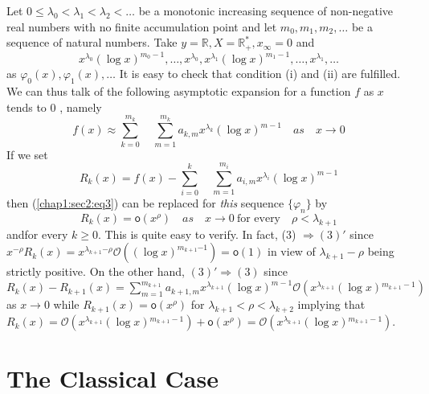 \begin{example}\label{chap1:sec2:exp2} %
  Let $0\le \lambda_{0} < \lambda_{1} < \lambda_{2} <
  \ldots$ be a monotonic increasing sequence of non-negative real
  numbers with no finite accumulation point and let
  $m_{0},m_{1},m_{2},\ldots$ be a sequence of natural numbers. Take
  $y=\mathbb{R}, X=\mathbb{R}_{+}^{*}, x_{\infty}=0$ and
  \begin{equation*}
    x^{\lambda_{0}}(\log
    x)^{m_0-1},\ldots,x^{\lambda_{0}},x^{\lambda_{1}} (\log
    x)^{m_1-1},\ldots,{x^{\lambda_{1}}},\ldots
  \end{equation*}
  as $\varphi_0(x),\varphi_1(x),\ldots$ It is easy to check that
  condition (i) and (ii) are fulfilled. We can thus talk of the
  following asymptotic expansion for a function $f$ as $x$ tends to $0$
  , namely
  \begin{equation*}
    f(x)\approx\sum_{k=0}^{m_k}\quad\sum_{m=1}^{m_k}a_{k,m}x{}^
    {\lambda_{k}}(\log
    x)^{m-1}\quad as \quad x\rightarrow 0
  \end{equation*}
  If we set
  \begin{equation*}
    R_{k}(x)=f(x)-\sum_{i=0}^{k}\quad\sum_{m=1}^{m_i}a_{i,m}x{}^{\lambda_{i}}(\log
    x)^{m-1}
  \end{equation*}
  then (\ref{chap1:sec2:eq3}) can be replaced for {\em this} sequence $\{\varphi_{n}\}$
  by
  \begin{equation*}
    R_{k}(x)=\mathsf{o}(x^{\rho})\quad as \quad x\rightarrow 0
    ~\text{for every} \quad
    \rho<\lambda_{k+1}\tag*{$(3')$}\label{chap1:sec2:eq3'} 
  \end{equation*}
  and\pageoriginale for every $k\ge0$. This is quite easy to verify. In fact,
  (3) $\Rightarrow(3)'$ since
  $x^{-\rho}R_{k}(x) = x{}^{\lambda_{k+1}{-\rho}}\mathcal{O}((\log
  x)^{m_{k+1}{-1}})=\mathsf{o}(1)$ in view of $\lambda_{k+1}-\rho$ being
  strictly positive. On the other hand, $(3)'\Rightarrow (3)$ since
  $R_{k}(x)-R_{k+1}(x)= \sum\limits_{m=1}^{m_{k+1}}
  a_{k+1,m}x^{\lambda_{k+1}}(\log x )^{m-1}\mathcal{O}(x^{\lambda_{k+1}}(\log
  x) {}^{m_{k+1}-1})$ as $x\rightarrow 0$ while
  $R_{k+1}(x)=\mathsf{o}{(x^{\rho})}$ for $\lambda_{k+1}<\rho<\lambda_{k+2}$
  implying that $R_{k}(x)=\mathcal{O}(x^{\lambda_{k+1}}(\log
  x){}^{m_{k+1}-1})+\mathsf{o}(x^\rho)=\mathcal{O}(x^{\lambda _{k+1}}(\log
  x){}^{m_{k+1}-1})$.
\end{example}

\section{The Classical Case} \label{chap1:sec3}

